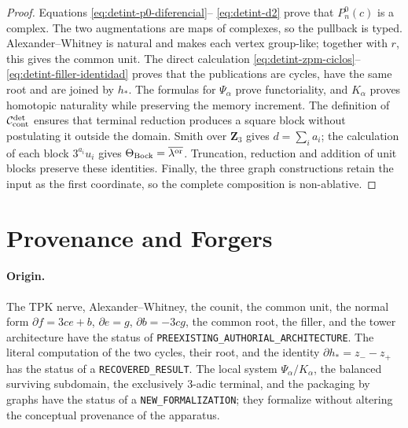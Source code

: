 \begin{proof}
Equations \eqref{eq:detint-p0-diferencial}--
\eqref{eq:detint-d2} prove that \(P_n^0(c)\) is a complex. The two
augmentations are maps of complexes, so the pullback is typed.
Alexander--Whitney is natural and makes each vertex group-like; together with
\(r\), this gives the common unit. The direct calculation
\eqref{eq:detint-zpm-ciclos}--\eqref{eq:detint-filler-identidad} proves that
the publications are cycles, have the same root and are joined by
\(h_*\). The formulas for \(\Psi_\alpha\) prove functoriality, and
\(K_\alpha\) proves homotopic naturality while preserving the memory
increment. The definition of \(\mathcal C_{\rm cont}^{\rm det}\) ensures that
terminal reduction produces a square block without postulating it outside the
domain. Smith over \(\mathbf Z_3\) gives \(d=\sum_i a_i\); the calculation of each
block \(3^{a_i}u_i\) gives
\(\Theta_{\rm Bock}=\overline{\lambda^{\rm or}}\). Truncation, reduction and
addition of unit blocks preserve these identities. Finally, the
three graph constructions retain the input as the first coordinate,
so the complete composition is non-ablative.
\end{proof}

\section{Provenance and Forgers}

\paragraph{Origin.}
The TPK nerve, Alexander--Whitney, the counit, the common unit, the normal
form \(\partial f=3ce+b\), \(\partial e=g\),
\(\partial b=-3cg\), the common root, the filler, and the tower architecture
have the status of \texttt{PREEXISTING\_AUTHORIAL\_ARCHITECTURE}. The literal computation
of the two cycles, their root, and the identity
\(\partial h_*=z_--z_+\) has the status of a \texttt{RECOVERED\_RESULT}. The
local system \(\Psi_\alpha/K_\alpha\), the balanced surviving subdomain,
the exclusively \(3\)-adic terminal, and the packaging by
graphs have the status of a \texttt{NEW\_FORMALIZATION}; they formalize without altering
the conceptual provenance of the apparatus.

